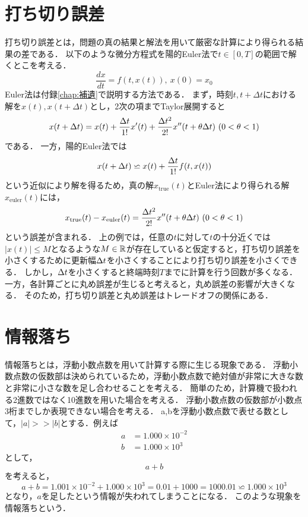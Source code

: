 \section{打ち切り誤差}
打ち切り誤差とは，問題の真の結果と解法を用いて厳密な計算により得られる結果の差である．
以下のような微分方程式を陽的Euler法で$t \in [0,T]$の範囲で解くとこを考える．
\begin{equation}
    \frac{dx}{dt} = f(t,x(t)), \ x(0) = x_0
\end{equation}
Euler法は付録\ref{chap:補遺}で説明する方法である．
まず，時刻$t,t+\Delta t$における解を$x(t),x(t+\Delta t)$とし，2次の項までTaylor展開すると
\begin{align}
    x(t + \Delta t) = x(t) + \frac{\Delta t}{1!}x^{\prime}(t) + \frac{\Delta t^2}{2!}x^{\prime\prime}(t + \theta\Delta t) \ (0 < \theta < 1)
\end{align}
である．
一方，陽的Euler法では
\begin{align}
    x(t + \Delta t) \backsimeq x(t) + \frac{\Delta t}{1!}f(t,x(t))
\end{align}
という近似により解を得るため，真の解$x_{\mathrm{true}}(t)$とEuler法により得られる解$x_{\mathrm{euler}}(t)$には，
\begin{align}
    x_{\mathrm{true}}(t) - x_{\mathrm{euler}}(t) = \frac{\Delta t^2}{2!}x^{\prime\prime}(t + \theta\Delta t) \ (0 < \theta < 1)
\end{align}
という誤差が含まれる．
上の例では，任意の$t$に対して$t$の十分近くでは$|x(t)| \leq M$となるような$M \in \mathbb{R}$が存在していると仮定すると，打ち切り誤差を小さくするために更新幅$\Delta t$を小さくすることにより打ち切り誤差を小さくできる．
しかし，$\Delta t$を小さくすると終端時刻$T$までに計算を行う回数が多くなる．
一方，各計算ごとに丸め誤差が生じると考えると，丸め誤差の影響が大きくなる．
そのため，打ち切り誤差と丸め誤差はトレードオフの関係にある．


\section{情報落ち}
情報落ちとは，浮動小数点数を用いて計算する際に生じる現象である．
浮動小数点数の仮数部は決められているため，浮動小数点数で絶対値が非常に大きな数と非常に小さな数を足し合わせることを考える．
簡単のため，計算機で扱われる2進数ではなく10進数を用いた場合を考える．
浮動小数点数の仮数部が小数点3桁までしか表現できない場合を考える．
a,bを浮動小数点数で表せる数として，$|a| >> |b|$とする．例えば
\begin{align}
    a &= 1.000 \times 10^{-2} \\
    b &= 1.000 \times 10^{3}
\end{align}
として，
\begin{equation}
    a + b
\end{equation}
を考えると，
\begin{equation}
    a + b = 1.001 \times 10^{-2} + 1.000 \times 10^{3} = 0.01 + 1000 = 1000.01 \backsimeq 1.000 \times 10^{3}
\end{equation}
となり，$a$を足したという情報が失われてしまうことになる．
このような現象を情報落ちという．

